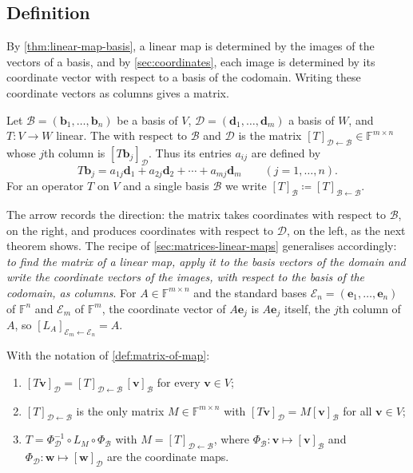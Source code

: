 \subsection{Definition}

By \cref{thm:linear-map-basis}, a linear map is determined by the images of the vectors of a basis, and by \cref{sec:coordinates}, each image is determined by its coordinate vector with respect to a basis of the codomain. Writing these coordinate vectors as columns gives a matrix.

\begin{definition}
\label{def:matrix-of-map}
Let $\mathcal B=(\mathbf b_1,\ldots,\mathbf b_n)$ be a basis of $V$, $\mathcal D=(\mathbf d_1,\ldots,\mathbf d_m)$ a basis of $W$, and $T\colon V\to W$ linear. The  with respect to $\mathcal B$ and $\mathcal D$ is the matrix $[T]_{\mathcal D\leftarrow\mathcal B}\in\mathbb F^{m\times n}$ whose $j$th column is $[T\mathbf b_j]_{\mathcal D}$. Thus its entries $a_{ij}$ are defined by
\[
T\mathbf b_j=a_{1j}\mathbf d_1+a_{2j}\mathbf d_2+\cdots+a_{mj}\mathbf d_m\qquad(j=1,\ldots,n).
\]
For an operator $T$ on $V$ and a single basis $\mathcal B$ we write $[T]_{\mathcal B}\coloneqq[T]_{\mathcal B\leftarrow\mathcal B}$.
\end{definition}

The arrow records the direction: the matrix takes coordinates with respect to $\mathcal B$, on the right, and produces coordinates with respect to $\mathcal D$, on the left, as the next theorem shows. The recipe of \cref{sec:matrices-linear-maps} generalises accordingly: \emph{to find the matrix of a linear map, apply it to the basis vectors of the domain and write the coordinate vectors of the images, with respect to the basis of the codomain, as columns}. For $A\in\mathbb F^{m\times n}$ and the standard bases $\mathcal E_n=(\mathbf e_1,\ldots,\mathbf e_n)$ of $\mathbb F^n$ and $\mathcal E_m$ of $\mathbb F^m$, the coordinate vector of $A\mathbf e_j$ is $A\mathbf e_j$ itself, the $j$th column of $A$, so $[L_A]_{\mathcal E_m\leftarrow\mathcal E_n}=A$.

\begin{theorem}
\label{thm:matrix-of-map}
With the notation of \cref{def:matrix-of-map}:
\begin{enumerate}
\item $[T\mathbf v]_{\mathcal D}=[T]_{\mathcal D\leftarrow\mathcal B}\,[\mathbf v]_{\mathcal B}$ for every $\mathbf v\in V$;
\item $[T]_{\mathcal D\leftarrow\mathcal B}$ is the only matrix $M\in\mathbb F^{m\times n}$ with $[T\mathbf v]_{\mathcal D}=M[\mathbf v]_{\mathcal B}$ for all $\mathbf v\in V$;
\item $T=\Phi_{\mathcal D}^{-1}\circ L_M\circ\Phi_{\mathcal B}$ with $M=[T]_{\mathcal D\leftarrow\mathcal B}$, where $\Phi_{\mathcal B}\colon\mathbf v\mapsto[\mathbf v]_{\mathcal B}$ and $\Phi_{\mathcal D}\colon\mathbf w\mapsto[\mathbf w]_{\mathcal D}$ are the coordinate maps.
\end{enumerate}
\end{theorem}

